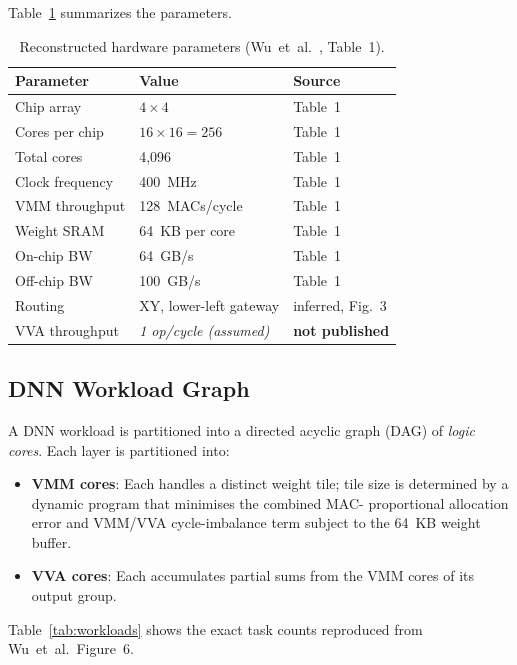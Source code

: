\documentclass[10pt,conference]{IEEEtran}
\begin{document}
Table~\ref{tab:hardware} summarizes the parameters.

\begin{table}[htbp]
  \caption{Reconstructed hardware parameters (Wu~et~al.~\cite{wu2020todaes},
           Table~1).}
  \label{tab:hardware}
  \centering
  \begin{tabular}{lll}
    \toprule
    Parameter & Value & Source \\
    \midrule
    Chip array & $4 \times 4$ & Table~1 \\
    Cores per chip & $16 \times 16 = 256$ & Table~1 \\
    Total cores & 4,096 & Table~1 \\
    Clock frequency & 400~MHz & Table~1 \\
    VMM throughput & 128~MACs/cycle & Table~1 \\
    Weight SRAM & 64~KB per core & Table~1 \\
    On-chip BW & 64~GB/s & Table~1 \\
    Off-chip BW & 100~GB/s & Table~1 \\
    Routing & XY, lower-left gateway & inferred, Fig.~3 \\
    VVA throughput & \emph{1 op/cycle (assumed)} & \textbf{not published} \\
    \bottomrule
  \end{tabular}
\end{table}

\subsection{DNN Workload Graph}

A DNN workload is partitioned into a directed acyclic graph (DAG) of
\emph{logic cores}.  Each layer is partitioned into:

\begin{itemize}
  \item \textbf{VMM cores}: Each handles a distinct weight tile; tile size is
        determined by a dynamic program that minimises the combined MAC-
        proportional allocation error and VMM/VVA cycle-imbalance term subject
        to the 64~KB weight buffer.
  \item \textbf{VVA cores}: Each accumulates partial sums from the VMM cores
        of its output group.
\end{itemize}

Table~\ref{tab:workloads} shows the exact task counts reproduced from
Wu~et~al.~Figure~6.
\end{document}
